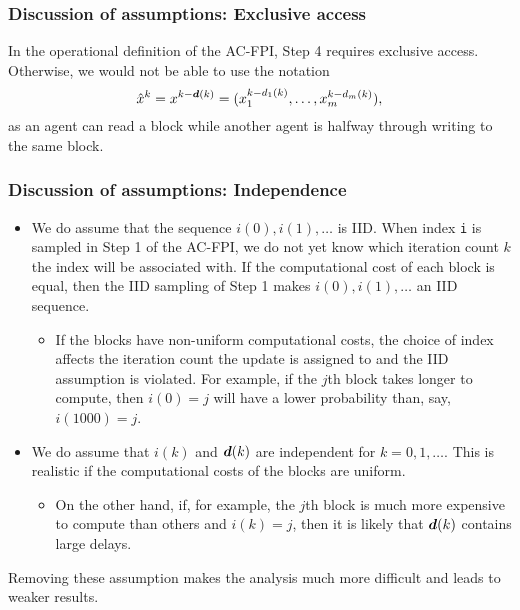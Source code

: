 \documentclass[10pt,mathserif]{beamer}
\begin{document}
\begin{frame}
\frametitle{Discussion of assumptions: Exclusive access}
In the operational definition of the AC-FPI, Step 4 requires exclusive access.
Otherwise, we would not be able to use the notation
\[
\hat{x}^k =x^{k-\boldsymbol{d}(k)}= (x_1^{k-d_1(k)},\dots,x_m^{k-d_m(k)}),
\]
as an agent can read a block while another agent is halfway through writing to the same block.



\end{frame}



\begin{frame}
\frametitle{Discussion of assumptions: Independence}

\begin{itemize}
    \item 
    We do assume that the sequence $i(0),i(1),\dots$ is IID.
    When index \verb|i| is sampled in Step 1 of the AC-FPI, we do not yet know which iteration count $k$ the index will be associated with.
    If the computational cost of each block is equal, then the IID sampling of Step 1 makes $i(0),i(1),\dots$ an IID sequence.
    \begin{itemize}
        \item 
        If the blocks have non-uniform computational costs, the choice of index affects the iteration count the update is assigned to and the IID assumption is violated.
        For example, if the $j$th block takes longer to compute, then $i(0)=j$ will have a lower probability than, say, $i(1000)=j$.
    \end{itemize}
    \item 
    We do assume that $i(k)$ and $\boldsymbol{d}(k)$ are independent for $k=0,1,\dots$.
    This is realistic if the computational costs of the blocks are uniform.
    \begin{itemize}
        \item 
        On the other hand, if, for example, the $j$th block is much more expensive to compute than others and $i(k)=j$, then it is likely that $\boldsymbol{d}(k)$ contains large delays.
    \end{itemize}
\end{itemize}
Removing these assumption makes the analysis much more difficult and leads to weaker results.
\end{frame}
\end{document}
